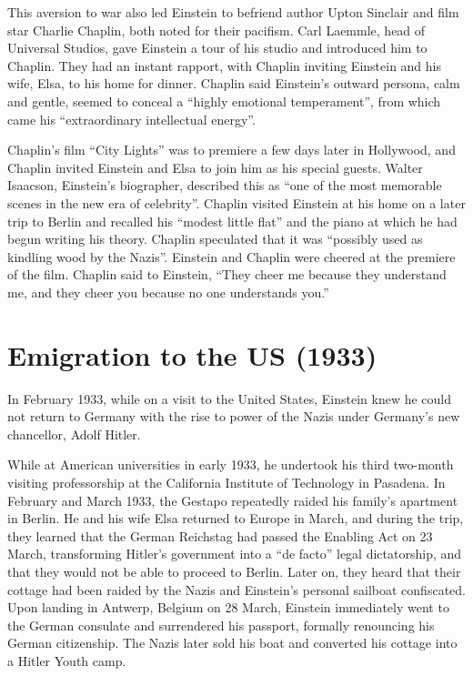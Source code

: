 \documentclass[twoside]{memoir}
\begin{document}
This aversion to war also led Einstein to befriend author Upton Sinclair and film star Charlie Chaplin, both noted for their pacifism. Carl Laemmle, head of Universal Studios, gave Einstein a tour of his studio and introduced him to Chaplin. They had an instant rapport, with Chaplin inviting Einstein and his wife, Elsa, to his home for dinner. Chaplin  said Einstein's outward persona, calm and gentle, seemed to conceal a \enquote{highly emotional temperament}, from which came his \enquote{extraordinary intellectual energy}.

Chaplin's film \enquote{City Lights} was to premiere a few days later in Hollywood, and Chaplin invited Einstein and Elsa to join him as his special guests. Walter Isaacson, Einstein's biographer, described this as \enquote{one of the most memorable scenes in the new era of celebrity}. Chaplin visited Einstein at his home on a later trip to Berlin and recalled his \enquote{modest little flat} and the piano at which he had begun writing his theory. Chaplin speculated that it was \enquote{possibly used as kindling wood by the Nazis}. Einstein and Chaplin were cheered at the premiere of the film. Chaplin said to Einstein, \enquote{They cheer me because they understand me, and they cheer you because no one understands you.}

\chapter{Emigration to the US (1933)}\label{emigration-to-the-us-1933}

In February 1933, while on a visit to the United States, Einstein knew he could not return to Germany with the rise to power of the Nazis under Germany's new chancellor, Adolf Hitler.

While at American universities in early 1933, he undertook his third two-month visiting professorship at the California Institute of Technology in Pasadena. In February and March 1933, the Gestapo repeatedly raided his family's apartment in  Berlin. He and his wife Elsa returned to Europe in March, and during the trip, they learned that the German Reichstag had passed the Enabling Act on 23 March, transforming Hitler's government into a \enquote{de facto} legal dictatorship, and that they would not be able to proceed to Berlin. Later on, they heard that their cottage had been raided by the Nazis and Einstein's personal sailboat confiscated. Upon landing in Antwerp, Belgium on 28 March, Einstein immediately went to the German consulate and surrendered his passport, formally renouncing his German citizenship. The Nazis later sold his boat and converted his cottage into a Hitler  Youth camp.\cite{el4GB}
\end{document}
